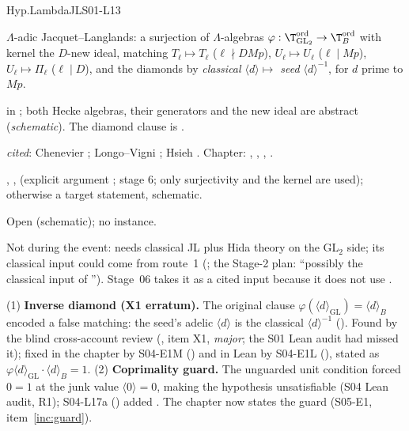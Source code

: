 \begin{hypentry}{Hyp.LambdaJL}{\kindoos}{S01-L13}
\item[Statement] $\Lambda$-adic Jacquet--Langlands: a surjection of $\Lambda$-algebras
  $\varphi:\T^{\mathrm{ord}}_{\mathrm{GL}_2}\to\T^{\mathrm{ord}}_B$ with kernel the $D$-new ideal, matching
  $T_\ell\mapsto T_\ell$ ($\ell\nmid DMp$), $U_\ell\mapsto U_\ell$ ($\ell\mid Mp$), $U_\ell\mapsto\Pi_\ell$ ($\ell\mid D$),
  and the diamonds by \emph{classical $\langle d\rangle\mapsto$ seed $\langle d\rangle^{-1}$}, for $d$ prime to $Mp$.
\item[Lean]  in ; both Hecke
  algebras, their generators and the new ideal are abstract (\emph{schematic}). The diamond clause is
  .
\item[Source] \emph{cited}: Chenevier \cite{Ch}; Longo--Vigni \cite[Prop.~6.1]{LV}; Hsieh \cite[\S4.5]{Hs}.
  Chapter: , , , .
\item[Used by] , ,  (explicit
  argument ; stage 6; only surjectivity and the kernel are used); otherwise a target statement, schematic.
\item[Status] Open (schematic); no instance.
\item[Discharge] Not during the event: needs classical JL plus Hida theory on the GL$_2$ side; its classical input could come
  from route~1 (; the Stage-2 plan: ``possibly the classical input of ''). Stage~06 takes it
  as a cited input because it does not use .
\item[History, corrections] (1) \textbf{Inverse diamond (X1 erratum).} The original clause
  $\varphi(\langle d\rangle_{\mathrm{GL}})=\langle d\rangle_B$ encoded a false matching: the seed's adelic
  $\langle d\rangle$ is the classical $\langle d\rangle^{-1}$ (). Found by the blind cross-account
  review (, item X1, \emph{major}; the S01 Lean audit had missed
  it); fixed in the chapter by S04-E1M () and in Lean by S04-E1L (), stated as
  $\varphi\langle d\rangle_{\mathrm{GL}}\cdot\langle d\rangle_B=1$. (2) \textbf{Coprimality guard.} The unguarded unit
  condition forced $0=1$ at the junk value $\langle 0\rangle=0$, making the hypothesis unsatisfiable (S04 Lean audit,
  R1); S04-L17a () added . The chapter now states the guard (S05-E1, item~\ref{inc:guard}).
\end{hypentry}


